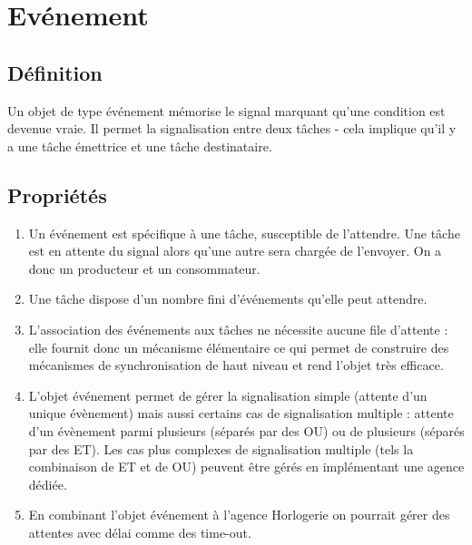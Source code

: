 \section{Evénement}

\subsection{Définition}

Un objet de type événement mémorise le signal marquant qu'une condition 
est devenue vraie. Il permet la signalisation entre deux tâches - cela 
implique qu'il y a une tâche émettrice et une tâche destinataire. 
~\\

\subsection{Propriétés}
\begin{enumerate}
   \item Un événement est spécifique à une tâche, susceptible de l'attendre.
   Une tâche est en attente du signal alors qu'une autre sera chargée de l'envoyer. 
   On a donc un producteur et un consommateur.
   \item Une tâche dispose d'un nombre fini d'événements qu'elle peut
   attendre.
   \item L'association des événements aux tâches ne nécessite aucune file
   d'attente : elle fournit donc un mécanisme élémentaire ce qui permet de 
   construire des mécanismes de synchronisation de haut niveau et rend l'objet très efficace.
   \item L'objet événement permet de gérer la signalisation simple (attente
   d'un unique évènement) mais aussi certains cas de signalisation multiple : attente d'un évènement 
   parmi plusieurs (séparés par des OU) ou de plusieurs (séparés par des ET). 
   Les cas plus complexes de signalisation multiple (tels la combinaison de ET
   et de OU) peuvent être gérés en implémentant une agence dédiée.
   \item En combinant l'objet événement à l'agence Horlogerie on pourrait
   gérer des attentes avec délai comme des time-out.
\end{enumerate}
~\\

